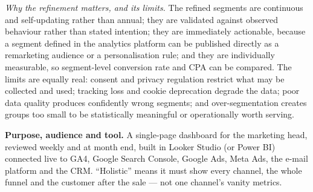 \begin{qlist}
\textit{Why the refinement matters, and its limits.} The refined segments are
continuous and self-updating rather than annual; they are validated against
observed behaviour rather than stated intention; they are immediately
actionable, because a segment defined in the analytics platform can be
published directly as a remarketing audience or a personalisation rule; and
they are individually measurable, so segment-level conversion rate and CPA can
be compared. The limits are equally real: consent and privacy regulation
restrict what may be collected and used; tracking loss and cookie deprecation
degrade the data; poor data quality produces confidently wrong segments; and
over-segmentation creates groups too small to be statistically meaningful or
operationally worth serving.

\textbf{Purpose, audience and tool.} A single-page dashboard for the marketing
head, reviewed weekly and at month end, built in Looker Studio (or Power BI)
connected live to GA4, Google Search Console, Google Ads, Meta Ads, the e-mail
platform and the CRM. ``Holistic'' means it must show every channel, the whole
funnel and the customer after the sale --- not one channel's vanity metrics.


\end{qlist}
